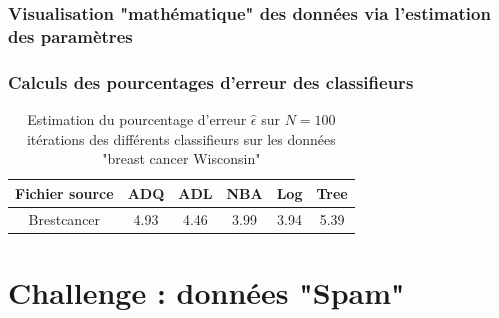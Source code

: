 \documentclass[a4paper,10pt]{report}
\begin{document}
\subsection{Visualisation "mathématique" des données via l'estimation des paramètres}



\subsection{Calculs des pourcentages d'erreur des classifieurs}

\begin{table}[H]
	\centering
	\captionsetup{justification=centering, margin=4cm}
	\begin{tabular}{c|c|c|c|c|c}
		Fichier source & ADQ & ADL & NBA & Log & Tree \\ 
		\hline
		Brestcancer & 4.93 & 4.46 & 3.99 & 3.94 & 5.39 \\ 
	\end{tabular}
	\caption{\small Estimation du pourcentage d'erreur $\hat{\epsilon}$ sur $N=100$ itérations des différents classifieurs sur les données "breast cancer Wisconsin"}
	\label{table:2-1-erreur-data-breastcancer}
\end{table}
























\chapter{Challenge : données "Spam"}
\end{document}
